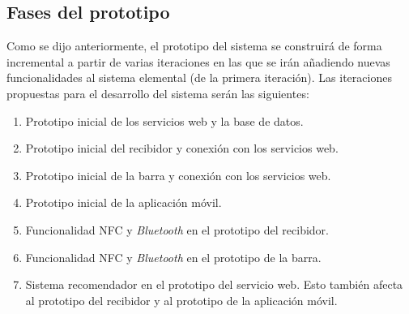   \subsection{Fases del prototipo}
Como se dijo anteriormente, el prototipo del sistema se construirá de forma
incremental a partir de varias iteraciones en las que se irán añadiendo
nuevas funcionalidades al sistema elemental (de la primera iteración). Las
iteraciones propuestas para el desarrollo del sistema serán las siguientes:
\begin{enumerate}
\item Prototipo inicial de los servicios web y la base de datos.
\item Prototipo inicial del recibidor y conexión con los servicios web.
\item Prototipo inicial de la barra y conexión con los servicios web.
\item Prototipo inicial de la aplicación móvil.
\item Funcionalidad \acs{NFC} y \emph{Bluetooth} en el prototipo del 
recibidor.
\item Funcionalidad \acs{NFC} y \emph{Bluetooth} en el prototipo de la barra.
\item Sistema recomendador en el prototipo del servicio web. Esto también
afecta al prototipo del recibidor y al prototipo de la aplicación móvil.
\end{enumerate}


